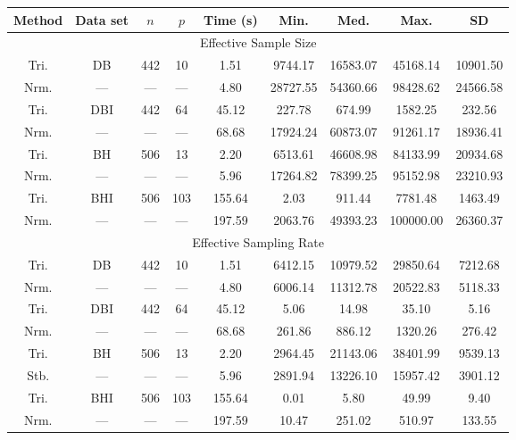 \documentclass{article}
\begin{document}
\begin{table}
\centering
\begin{tabular}{c c c c c c c c c}
Method & Data set & $n$ & $p$ & Time (s) & Min. & Med. & Max. & SD \\
\hline 
\multicolumn{9}{c}{Effective Sample Size} \\
Tri. & DB  & 442 &  10 & 1.51 &  9744.17 & 16583.07 & 45168.14 & 10901.50 \\
Nrm. & --- & --- & --- & 4.80 & 28727.55 & 54360.66 & 98428.62 & 24566.58 \\

Tri. & DBI & 442 &  64 & 45.12 &   227.78 &   674.99 &  1582.25 &   232.56 \\
Nrm. & --- & --- & --- & 68.68 & 17924.24 & 60873.07 & 91261.17 & 18936.41 \\

Tri. & BH  & 506 & 13  & 2.20 & 6513.61  & 46608.98 & 84133.99 & 20934.68 \\
Nrm. & --- & --- & --- & 5.96 & 17264.82 & 78399.25 & 95152.98 & 23210.93 \\

Tri. & BHI & 506 & 103 & 155.64 & 2.03 & 911.44 & 7781.48 & 1463.49 \\
Nrm. & --- & --- & --- & 197.59 & 2063.76 & 49393.23 & 100000.00 & 26360.37 \\

\multicolumn{9}{c}{Effective Sampling Rate} \\

Tri. & DB  & 442 &  10 & 1.51 & 6412.15 & 10979.52 & 29850.64 & 7212.68 \\
Nrm. & --- & --- & --- & 4.80 & 6006.14 & 11312.78 & 20522.83 & 5118.33 \\

Tri. & DBI & 442 & 64  & 45.12 &   5.06 &  14.98 &   35.10 &   5.16 \\
Nrm. & --- & --- & --- & 68.68 & 261.86 & 886.12 & 1320.26 & 276.42 \\

Tri. & BH  & 506 &  13 & 2.20 & 2964.45 & 21143.06 & 38401.99 & 9539.13 \\
Stb. & --- & --- & --- & 5.96 & 2891.94 & 13226.10 & 15957.42 & 3901.12 \\

Tri. & BHI & 506 & 103 & 155.64 & 0.01 & 5.80 & 49.99 & 9.40 \\
Nrm. & --- & --- & --- & 197.59 & 10.47 & 251.02 & 510.97 & 133.55 


\end{tabular}
\end{table}
\end{document}
